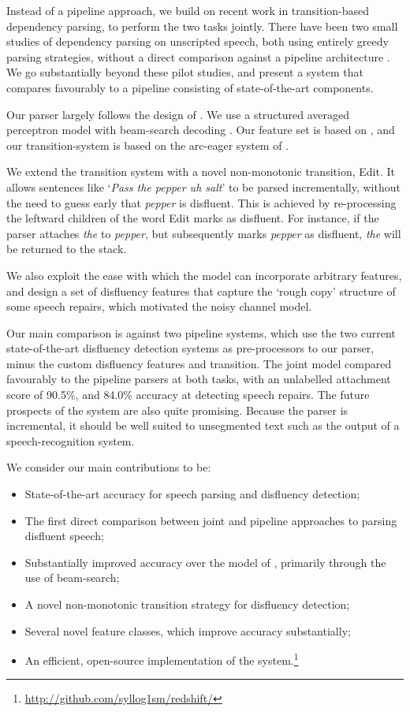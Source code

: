 \documentclass[11pt,letterpaper]{article}
\begin{document}
Instead of a pipeline approach, we build on recent work in transition-based dependency
parsing, to perform the two tasks jointly.
There have been two small studies of dependency parsing on unscripted speech,
both using entirely greedy parsing strategies, without a direct comparison
against a pipeline architecture \citep{jorgensen:07,rasooli:13}.  We go substantially
beyond these pilot studies, and present a system that compares favourably to a
pipeline consisting of state-of-the-art components.

Our parser largely follows the design of \citet{zhang:cl11}. We use a structured averaged
perceptron model with beam-search decoding \citep{collins:02}. Our feature set
is based on \citet{zhang:cl11}, and our transition-system is based on the arc-eager
system of \citet{nivre:03}.

We extend the transition system with a novel non-monotonic transition, Edit.
It allows sentences like `\emph{Pass the pepper uh salt}'
to be parsed incrementally, without the need to guess early that \emph{pepper}
is disfluent.  This is achieved by re-processing the leftward children of
the word Edit marks as disfluent.  For instance, if the parser attaches \emph{the}
to \emph{pepper}, but subsequently marks \emph{pepper} as disfluent, \emph{the} will
be returned to the stack.

We also exploit the ease with which the model can incorporate arbitrary
features, and design a set of disfluency features that capture the
`rough copy' structure of some speech repairs, which motivated the
\citet{Johnson04a} noisy channel model.

Our main comparison is against two pipeline systems, which use the two current 
state-of-the-art disfluency detection systems as pre-processors to our
parser, minus the custom disfluency features and transition.
The joint model compared favourably to the pipeline parsers at both tasks, with
an unlabelled attachment score of 90.5\%, and 84.0\% accuracy at detecting speech
repairs.
The future prospects of the system are also quite promising.
Because the parser is incremental, it should be well suited to
unsegmented text such as the output of a speech-recognition system.

We consider our main contributions to be:

\begin{itemize}
    \item State-of-the-art accuracy for speech parsing and disfluency detection;
    \item The first direct comparison between joint and pipeline approaches to
          parsing disfluent speech;
    \item Substantially improved accuracy over the model of \citet{rasooli:13},
          primarily through the use of beam-search;
    \item A novel non-monotonic transition strategy for disfluency detection;
    \item Several novel feature classes, which improve accuracy substantially;
    \item An efficient, open-source implementation of the system.\footnote{\url{http://github.com/syllog1sm/redshift/}}
\end{itemize}
\end{document}
